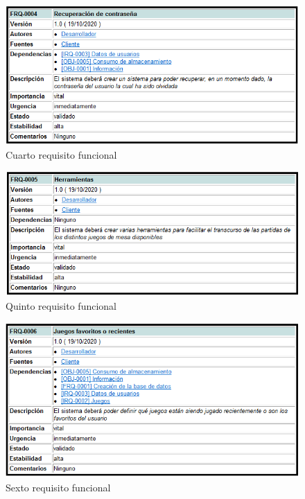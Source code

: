 \begin{figure}[H]
    \centering
    \includegraphics[width=1\linewidth]{fig/Requisitos funcionales/rf4.png}
    \caption{Cuarto requisito funcional}
    \label{fig:rf4}
\end{figure}
\begin{figure}[H]
    \centering
    \includegraphics[width=1\linewidth]{fig/Requisitos funcionales/rf5.png}
    \caption{Quinto requisito funcional}
    \label{fig:rf5}
\end{figure}
\begin{figure}[H]
    \centering
    \includegraphics[width=1\linewidth]{fig/Requisitos funcionales/rf6.png}
    \caption{Sexto requisito funcional}
    \label{fig:rf6}
\end{figure}

